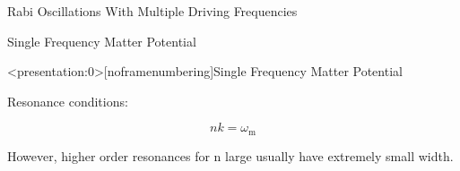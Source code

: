 \documentclass[9pt]{beamer}
\begin{document}
\begin{darkframes}
\begin{frame}{Rabi Oscillations With Multiple Driving Frequencies}
\end{frame}









\begin{frame}{Single Frequency Matter Potential}






\end{frame}



\begin{frame}<presentation:0>[noframenumbering]{Single Frequency Matter Potential}

Resonance conditions:

\begin{equation*}
    nk=\omega_{\mathrm m}
\end{equation*}

However, higher order resonances for n large usually have extremely small width.




\end{frame}
\end{darkframes}
\end{document}
